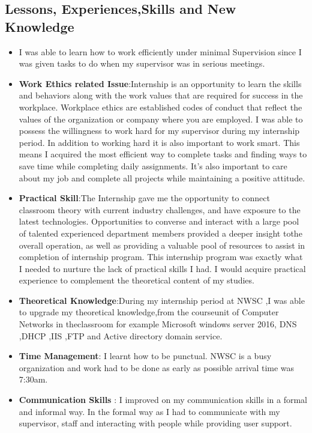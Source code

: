 \documentclass{article}
\begin{document}
\subsection{Lessons, Experiences,Skills and New Knowledge}
\begin{itemize}
\item I was able to learn how to work efficiently under minimal Supervision since I was given tasks to do when my supervisor was in serious meetings.
  \item \textbf{Work Ethics related Issue}:Internship is an opportunity to learn the skills and behaviors along with the work values that are required for success in the workplace. Workplace ethics are established codes of conduct that reflect the values of the organization or company where you are employed. I was able to possess the willingness to work hard for my supervisor during my internship period. In addition to working hard it is also important to work smart. This means I acquired the most efficient way to complete tasks and finding ways to save time while completing daily assignments. It’s also important to care about my job and complete all projects while maintaining a positive attitude.
\item \textbf{Practical Skill}:The Internship gave me  the opportunity to connect classroom theory with current industry challenges, and have exposure to the latest technologies. Opportunities to converse and interact with a large pool of talented experienced department members  provided a deeper insight tothe overall operation, as well as providing a valuable pool of resources to assist in completion of internship program. This internship program was exactly what I needed to nurture the lack of practical skills I had. I would acquire practical experience to complement the theoretical content of my studies.
\item \textbf{Theoretical Knowledge}:During my internship period at NWSC ,I was able to  upgrade my theoretical knowledge,from the courseunit  of  Computer Networks in theclassroom for example Microsoft windows server 2016, DNS ,DHCP ,IIS ,FTP and Active directory domain service.
  \item \textbf{Time Management}:  I learnt how to be punctual. NWSC is a busy organization and work had to be done as early as possible arrival time was 7:30am.
\item \textbf{Communication Skills} : I improved on my  communication skills in a formal and informal way. In the formal way as I had to communicate with my supervisor, staff and interacting with people while providing user support.

\end{itemize}
\end{document}
